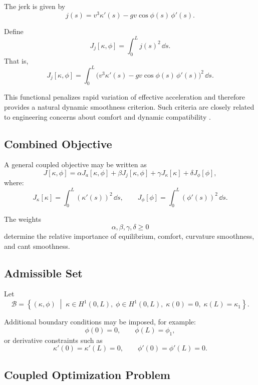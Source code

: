 \begin{definition}[Jerk]
The jerk is given by
\[
j(s)
=
v^3 \kappa'(s) - g v \cos\phi(s)\,\phi'(s).
\]
\end{definition}

\begin{definition}
Define
\[
J_j[\kappa,\phi]
=
\int_0^L j(s)^2 \,\dd s.
\]
That is,
\[
J_j[\kappa,\phi]
=
\int_0^L
\bigl(
v^3 \kappa'(s) - g v \cos\phi(s)\,\phi'(s)
\bigr)^2
\,\dd s.
\]
\end{definition}

This functional penalizes rapid variation of effective acceleration and
therefore provides a natural dynamic smoothness criterion. Such criteria
are closely related to engineering concerns about comfort and dynamic
compatibility \cite{EN13803_2017,BrustadDalmo2020Review}.

\subsection{Combined Objective}

\begin{definition}
A general coupled objective may be written as
\[
J[\kappa,\phi]
=
\alpha J_a[\kappa,\phi]
+
\beta J_j[\kappa,\phi]
+
\gamma J_\kappa[\kappa]
+
\delta J_\phi[\phi],
\]
where:
\[
J_\kappa[\kappa]
=
\int_0^L (\kappa'(s))^2 \,\dd s,
\qquad
J_\phi[\phi]
=
\int_0^L (\phi'(s))^2 \,\dd s.
\]
\end{definition}

The weights
\[
\alpha,\beta,\gamma,\delta \ge 0
\]
determine the relative importance of equilibrium, comfort, curvature
smoothness, and cant smoothness.

\subsection{Admissible Set}

\begin{definition}
Let
\[
\mathcal{B}
=
\left\{
(\kappa,\phi)
\;\middle|\;
\kappa \in H^1(0,L),\;
\phi \in H^1(0,L),
\;
\kappa(0)=0,\;
\kappa(L)=\kappa_1
\right\}.
\]
\end{definition}

Additional boundary conditions may be imposed, for example:
\[
\phi(0)=0,
\qquad
\phi(L)=\phi_1,
\]
or derivative constraints such as
\[
\kappa'(0)=\kappa'(L)=0,
\qquad
\phi'(0)=\phi'(L)=0.
\]

\subsection{Coupled Optimization Problem}

